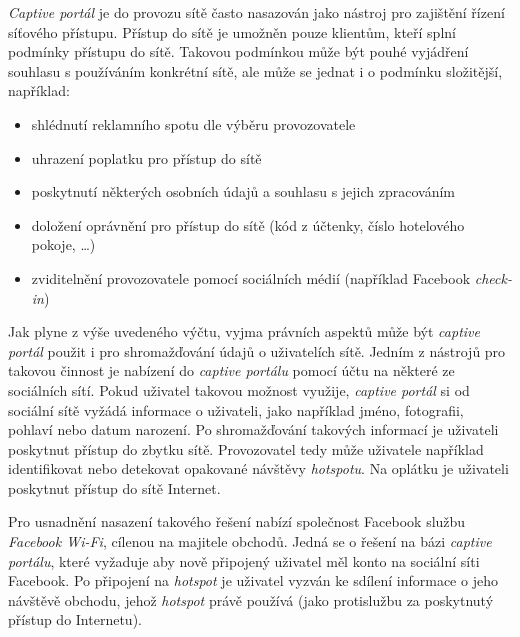 \documentclass[thesis=M,czech]{FITthesis}[2012/10/20]
\begin{document}

\textit{Captive portál} je do provozu sítě často nasazován jako nástroj pro zajištění řízení síťového přístupu. Přístup do sítě je umožněn pouze klientům, kteří splní podmínky přístupu do sítě. Takovou podmínkou může být pouhé vyjádření souhlasu s používáním konkrétní sítě, ale může se jednat i o podmínku složitější, například:

\begin{itemize}
 \item shlédnutí reklamního spotu dle výběru provozovatele
 \item uhrazení poplatku pro přístup do sítě
 \item poskytnutí některých osobních údajů a souhlasu s jejich zpracováním
 \item doložení oprávnění pro přístup do sítě (kód z účtenky, číslo hotelového pokoje, \ldots)
 \item zviditelnění provozovatele pomocí sociálních médií (například Facebook \textit{check-in})
\end{itemize}

Jak plyne z výše uvedeného výčtu, vyjma právních aspektů může být \textit{captive portál} použit i pro shromažďování údajů o uživatelích sítě. Jedním z nástrojů pro takovou činnost je nabízení  do \textit{captive portálu} pomocí účtu na některé ze sociálních sítí. Pokud uživatel takovou možnost využije, \textit{captive portál} si od sociální sítě vyžádá informace o uživateli, jako například jméno, fotografii, pohlaví nebo datum narození. Po shromažďování takových informací je uživateli poskytnut přístup do zbytku sítě. Provozovatel tedy může uživatele například identifikovat nebo detekovat opakované návštěvy \textit{hotspotu}. Na oplátku je uživateli  poskytnut přístup do sítě Internet.


Pro usnadnění nasazení takového řešení nabízí společnost Facebook službu \textit{Facebook Wi-Fi}\cite{facebook_wifi}, cílenou na majitele obchodů. Jedná se o řešení na bázi \textit{captive portálu}, které vyžaduje aby nově připojený uživatel měl konto na sociální síti Facebook. Po připojení na \textit{hotspot} je uživatel vyzván ke sdílení informace o jeho návštěvě obchodu, jehož \textit{hotspot} právě používá (jako protislužbu za poskytnutý přístup do Internetu).
\end{document}
